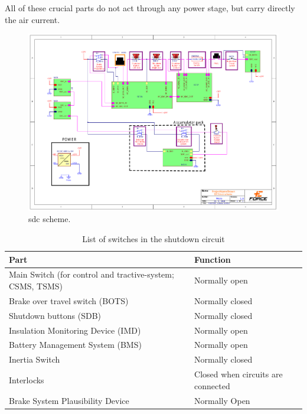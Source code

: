 All of these crucial parts do not act through any power stage, but carry directly the \gls{air} current.


\begin{figure}[H]
	\includegraphics[width=\textwidth, trim={2cm 3cm 2cm 2cm},clip]{./img/SDC-scheme.pdf}
	\caption{\gls{sdc} scheme.}
	\label{fig:SDC-scheme}
\end{figure}

\begin{table}[H]
	\caption{List of switches in the shutdown circuit}
	\centering
	\begin{tabu}{|X|l|}
		\hline Part  & Function \\
		\hline Main Switch (for control and tractive-system; CSMS, TSMS) & Normally open \\
		\hline Brake over travel switch (BOTS) & Normally closed \\
		\hline Shutdown buttons (SDB) & Normally closed \\
		\hline Insulation Monitoring Device (IMD) & Normally open \\
		\hline Battery Management System (BMS) & Normally open \\
		\hline Inertia Switch & Normally closed \\
		\hline Interlocks & Closed when circuits are connected \\
		\hline Brake System Plausibility Device & Normally Open \\
		\hline
	\end{tabu}%
	\label{tab:SDCswitch}%
\end{table}%

